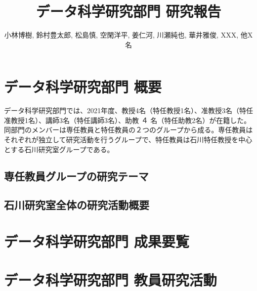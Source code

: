 \documentclass[11pt]{jarticle}
\title{データ科学研究部門 研究報告}
\author{小林博樹, 鈴村豊太郎, 松島慎, 空閑洋平, 姜仁河, 川瀬純也, 華井雅俊, XXX, 他X名}
\begin{document}
\maketitle

\section{データ科学研究部門 概要}
データ科学研究部門では、2021年度、教授4名（特任教授1名）、准教授3名（特任准教授1名）、講師3名（特任講師3名）、助教 ４ 名（特任助教2名）が在籍した。同部門のメンバーは専任教員と特任教員の２つのグループから成る。専任教員はそれぞれが独立して研究活動を行うグループで、特任教員は石川特任教授を中心とする石川研究室グループである。 



\subsection{専任教員グループの研究テーマ}



\subsection{石川研究室全体の研究活動概要}

\section{データ科学研究部門 成果要覧}


\section{データ科学研究部門 教員研究活動}
\end{document}
